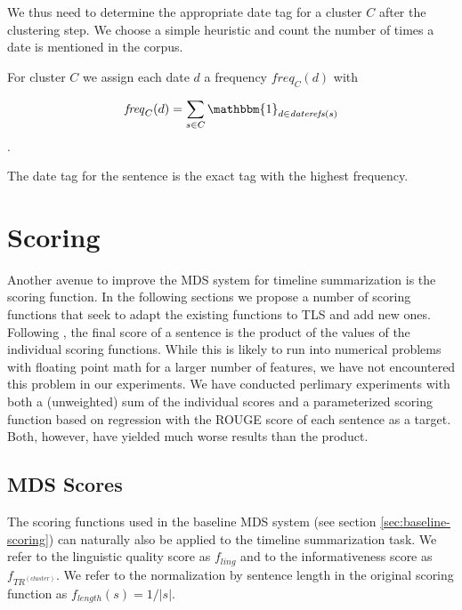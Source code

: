 \documentclass[a4paper,BCOR=10mm]{report}
\numberwithin{lemma}{chapter}
\numberwithin{definition}{chapter}
\begin{document}
We thus need to determine the appropriate date tag for a cluster $C$ after the clustering step. We choose a simple heuristic and count the number of times a date is mentioned in the corpus.

For cluster $C$ we assign each date $d$ a frequency $\mathit{freq}_C(d)$ with

\begin{equation}
\mathit{freq}_C(d) = \sum_{s \in C} \mathbbm{1}_{d \in \mathit{daterefs}(s)}
\end{equation}.

The date tag for the sentence is the exact tag with the highest frequency.



\section{Scoring} \label{sec:scoring}

Another avenue to improve the MDS system for timeline summarization is the scoring function.
In the following sections we propose a number of scoring functions that seek to adapt the existing functions to TLS and add new ones.
Following \citet{banerjee}, the final score of a sentence is the product of the values of the individual scoring functions.
While this is likely to run into numerical problems with floating point math for a larger number of features, we have not encountered this problem in our experiments.
We have conducted perlimary experiments with both a (unweighted) sum of the individual scores and a parameterized scoring function based on regression with the ROUGE score of each sentence as a target. Both, however, have yielded much worse results than the product.

\subsection{MDS Scores} \label{sec:mds-scores}

The scoring functions used in the baseline MDS system (see section \ref{sec:baseline-scoring}) can naturally also be applied to the timeline summarization task.
We refer to the linguistic quality score as $f_{ling}$ and to the informativeness score as $f_{TR^{(cluster)}}$.
We refer to the normalization by sentence length in the original scoring function as $f_{length}(s) = 1 / |s|$.
\end{document}
